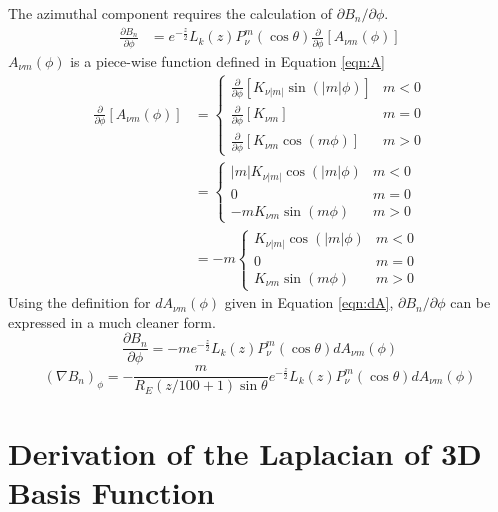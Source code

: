 \documentclass[12pt,letterpaper]{article}
\begin{document}
  The azimuthal component requires the calculation of \(\partial B_n/\partial \phi\).
  \begin{align}
    \frac{\partial B_n}{\partial \phi} &= e^{-\frac{z}{2}}L_k(z)P_\nu^m(\cos\theta)\frac{\partial}{\partial \phi}\left[A_{\nu m}(\phi)\right]
  \end{align}
  \(A_{\nu m}(\phi)\) is a piece-wise function defined in Equation \ref{eqn:A}
  \begin{align}
    \frac{\partial}{\partial \phi}\left[A_{\nu m}(\phi)\right] &= \begin{cases}
                        \frac{\partial}{\partial \phi}\left[K_{\nu |m|}\sin(|m|\phi)\right] & m < 0 \\
                        \frac{\partial}{\partial \phi}\left[K_{\nu m}\right] & m = 0 \\
                        \frac{\partial}{\partial \phi}\left[K_{\nu m}\cos(m\phi)\right] & m > 0
                      \end{cases} \\
    &= \begin{cases}
      |m| K_{\nu |m|}\cos(|m|\phi) & m < 0 \\
      0 & m = 0 \\
      -m K_{\nu m}\sin(m\phi) & m > 0
    \end{cases} \\
    &= -m \begin{cases}
      K_{\nu |m|}\cos(|m|\phi) & m < 0 \\
      0 & m = 0 \\
      K_{\nu m}\sin(m\phi) & m > 0
    \end{cases}
  \end{align}
  Using the definition for \(dA_{\nu m}(\phi)\) given in Equation \ref{eqn:dA}, \(\partial B_n/\partial \phi\) can be expressed in a much cleaner form.
  \begin{equation}
    \frac{\partial B_n}{\partial \phi} = -m e^{-\frac{z}{2}}L_k(z)P_\nu^m(\cos\theta)dA_{\nu m}(\phi)
  \end{equation}
  \begin{equation}
    (\nabla B_n)_\phi = -\frac{m}{R_E(z/100+1)\sin\theta}e^{-\frac{z}{2}}L_k(z)P_\nu^m(\cos\theta)dA_{\nu m}(\phi)
  \end{equation}

\section{Derivation of the Laplacian of 3D Basis Function}
  \label{app:laplacian}
\end{document}

